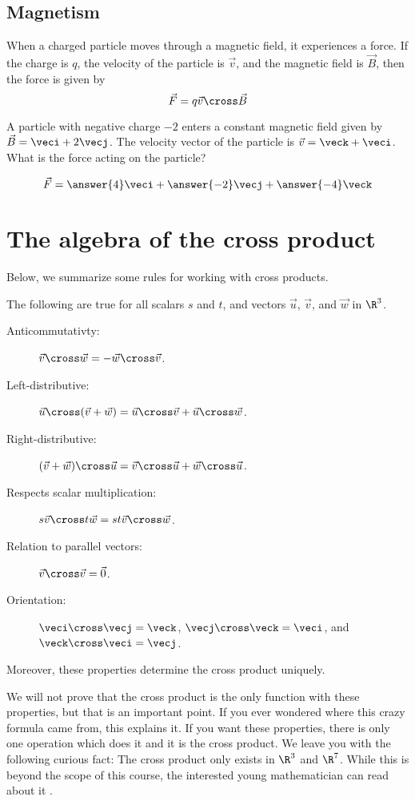 \documentclass{ximera}
\begin{document}
\subsection{Magnetism} 

When a charged particle moves through a magnetic field, it experiences
a force.  If the charge is $q$, the velocity of the particle is
$\vec{v}$, and the magnetic field is $\vec{B}$, then the force is
given by
\[
\vec{F} = q\vec{v} \cross \vec{B}
\]

\begin{question}
  A particle with negative charge $-2$ enters a constant magnetic
  field given by $\vec{B} = \veci+2\vecj$.  The velocity vector of
  the particle is $\vec{v} = \veck+\veci$.  What is the force
  acting on the particle?
  \begin{prompt}
  \[
  \vec{F} = \answer{4}\veci+\answer{-2}\vecj+\answer{-4}\veck
  \]
  \end{prompt}
\end{question}


\section{The algebra of the cross product}


Below, we summarize some rules for working with cross products.

\begin{theorem}
  The following are true for all scalars $s$ and $t$, and vectors
  $\vec{u}$, $\vec{v}$, and $\vec{w}$ in $\R^3$.
  \begin{description}
  \item[Anticommutativty:] $\vec{v} \cross \vec{w}  = -\vec{w} \cross \vec{v}$.
  \item[Left-distributive:] $\vec{u} \cross (\vec{v} +\vec{w}) = \vec{u} \cross \vec{v}+\vec{u}\cross\vec{w}$.
  \item[Right-distributive:] $(\vec{v}+\vec{w}) \cross \vec{u} = \vec{v} \cross \vec{u}+\vec{w} \cross \vec{u}$.
  \item[Respects scalar multiplication:] $s\vec{v} \cross t\vec{w} = st \vec{v} \cross \vec{w}$.
  \item[Relation to parallel vectors:] $\vec{v} \cross \vec{v} = \vec{0}$.
  \item[Orientation:] $\veci \cross \vecj = \veck$, $\vecj \cross \veck = \veci$, and $\veck \cross \veci = \vecj$. 
  \end{description}
  Moreover, these properties determine the cross product uniquely.
\end{theorem}

We will not prove that the cross product is the only function with
these properties, but that is an important point.  If you ever
wondered where this crazy formula came from, this explains it.  If you
want these properties, there is only one operation which does it and
it is the cross product. We leave you with the following curious fact:
The cross product only exists in $\R^3$ and $\R^7$. While this is
beyond the scope of this course, the interested young mathematician can read about it .
\end{document}
